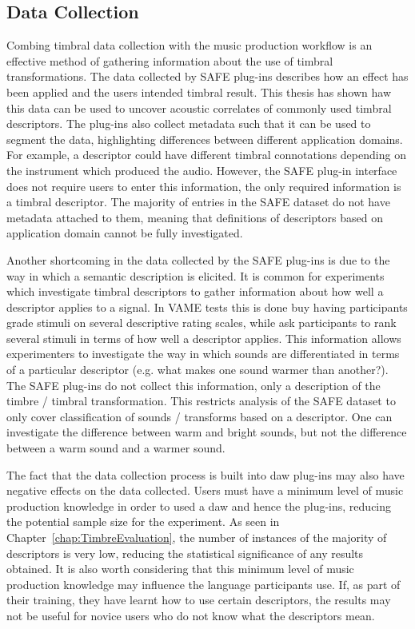 	\subsection{Data Collection}
	\label{sec:Conclusion-Critique-DataCollection}
		Combing timbral data collection with the music production workflow is an effective method of gathering
		information about the use of timbral transformations. The data collected by SAFE plug-ins describes how an
		effect has been applied and the users intended timbral result. This thesis has shown haw this data can be
		used to uncover acoustic correlates of commonly used timbral descriptors. The plug-ins also collect metadata
		such that it can be used to segment the data, highlighting differences between different application
		domains. For example, a descriptor could have different timbral connotations depending on the instrument
		which produced the audio. However, the SAFE plug-in interface does not require users to enter this
		information, the only required information is a timbral descriptor. The majority of entries in the SAFE
		dataset do not have metadata attached to them, meaning that definitions of descriptors based on application
		domain cannot be fully investigated. 

		Another shortcoming in the data collected by the SAFE plug-ins is due to the way in which a semantic
		description is elicited. It is common for experiments which investigate timbral descriptors to gather
		information about how well a descriptor applies to a signal. In VAME tests this is done buy having
		participants grade stimuli on several descriptive rating scales, while \citet{cartwright2013socialeq} ask
		participants to rank several stimuli in terms of how well a descriptor applies. This information allows
		experimenters to investigate the way in which sounds are differentiated in terms of a particular descriptor
		(e.g. what makes one sound warmer than another?). The SAFE plug-ins do not collect this information, only a
		description of the timbre / timbral transformation. This restricts analysis of the SAFE dataset to only
		cover classification of sounds / transforms based on a descriptor. One can investigate the difference
		between warm and bright sounds, but not the difference between a warm sound and a warmer sound.

		The fact that the data collection process is built into \acrshort{daw} plug-ins may also have negative
		effects on the data collected. Users must have a minimum level of music production knowledge in order to
		used a \acrshort{daw} and hence the plug-ins, reducing the potential sample size for the experiment. As seen
		in Chapter~\ref{chap:TimbreEvaluation}, the number of instances of the majority of descriptors is very low,
		reducing the statistical significance of any results obtained. It is also worth considering that this
		minimum level of music production knowledge may influence the language participants use. If, as part of
		their training, they have learnt how to use certain descriptors, the results may not be useful for novice
		users who do not know what the descriptors mean.

